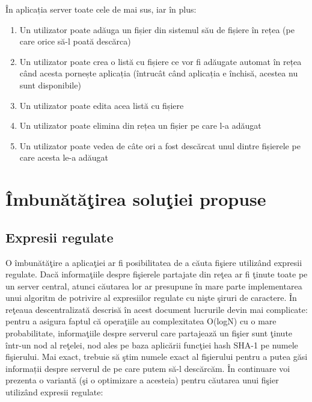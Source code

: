 \documentclass[runningheads]{llncs}
\begin{document}
În aplicația server toate cele de mai sus, iar în plus:

\begin{enumerate}
	\item Un utilizator poate adăuga un fișier din sistemul său de fișiere în rețea (pe care orice să-l poată descărca)
	\item Un utilizator poate crea o listă cu fișiere ce vor fi adăugate automat în rețea când acesta pornește aplicația (întrucât când aplicația e închisă, acestea nu sunt disponibile)
	\item Un utilizator poate edita acea listă cu fișiere
	\item Un utilizator poate elimina din rețea un fișier pe care l-a adăugat
	\item Un utilizator poate vedea de câte ori a fost descărcat unul dintre fișierele pe care acesta le-a adăugat
\end{enumerate}

\section{Îmbunătăţirea soluţiei propuse}

\subsection{Expresii regulate}

O îmbunătăţire a aplicaţiei ar fi posibilitatea de a căuta fişiere utilizând expresii regulate. Dacă informaţiile despre fişierele partajate din reţea ar fi ţinute toate pe un server central, atunci căutarea lor ar presupune în mare parte implementarea unui algoritm de potrivire al expresiilor regulate cu nişte şiruri de caractere. În reţeaua descentralizată descrisă în acest document lucrurile devin mai complicate: pentru a asigura faptul că operaţiile au complexitatea O(logN) cu o mare probabilitate, informaţiile despre serverul care partajează un fişier sunt ţinute într-un nod al reţelei, nod ales pe baza aplicării funcţiei hash SHA-1 pe numele fişierului. Mai exact, trebuie să ştim numele exact al fişierului pentru a putea găsi informații despre serverul de pe care putem să-l descărcăm. În continuare voi prezenta o variantă (şi o optimizare a acesteia) pentru căutarea unui fişier utilizând expresii regulate: 
\end{document}
